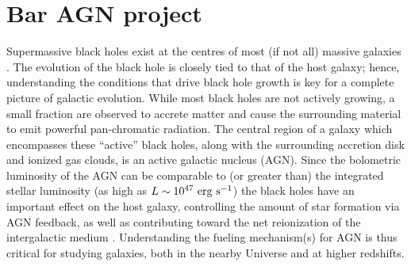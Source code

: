 
\chapter{Bar AGN project}
\label{chap:baragn}


\newcommand\pfeatures{$p_{\rm{features~or~disk}}$}
\newcommand\pnotedgeon{$p_{\rm{not~edge-on}}$}
\newcommand\pbar{$p_{\rm{bar}}$}
\newcommand\pnobar{$p_{\rm{no~bar}}$}
\newcommand\gztwo{Galaxy~Zoo~2}
\newcommand\mbh{$M_{\rm{BH}}$}
\newcommand\db{$d_{\rm{B-NB}}$}
\newcommand\fb{$f_{\rm{B>NB}}$}
\newcommand\pasa{PASA}


Supermassive black holes exist at the centres of most (if not all) massive galaxies \citep{Kormendy1995,Richstone1998,Kormendy2001,Ghez2008}. The evolution of the black hole is closely tied to that of the host galaxy; hence, understanding the conditions that drive black hole growth is key for a complete picture of galactic evolution. While most black holes are not actively growing, a small fraction are observed to accrete matter and cause the surrounding material to emit powerful pan-chromatic radiation. The central region of a galaxy which encompasses these ``active'' black holes, along with the surrounding accretion disk and ionized gas clouds, is an active galactic nucleus (AGN). Since the bolometric luminosity of the AGN can be comparable to (or greater than) the integrated stellar luminosity (as high as $L\sim10^{47}~\rm{erg}~\rm{s}^{-1}$) the black holes have an important effect on the host galaxy, controlling the amount of star formation via AGN feedback, as well as contributing toward the net reionization of the intergalactic medium \citep{Heckman2014}. Understanding the fueling mechanism(s) for AGN is thus critical for studying galaxies, both in the nearby Universe and at higher redshifts. 

